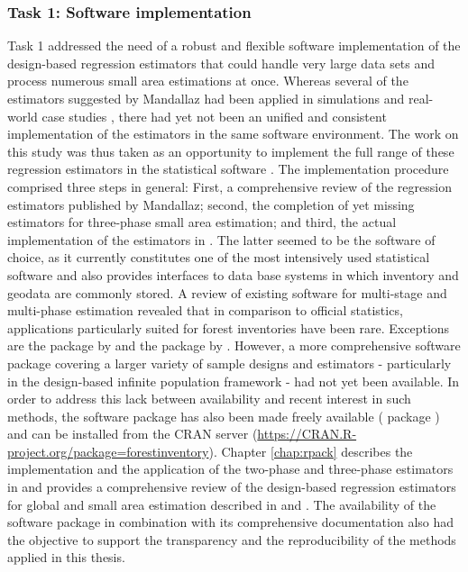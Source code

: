 \subsubsection{Task 1: Software implementation} %


Task 1 addressed the need of a robust and flexible software implementation of the design-based regression estimators that could handle very large data sets and process numerous small area estimations at once. Whereas several of the estimators suggested by Mandallaz had been applied in simulations and real-world case studies \citep{mandallaz2013a, mandallaz2013b, mandallaz2013c, massey2014a, massey2015a, massey2015b}, there had yet not been an unified and consistent implementation of the estimators in the same software environment. The work on this study was thus taken as an opportunity to implement the full range of these regression estimators in the statistical software  \citep{R}. The implementation procedure comprised three steps in general: First, a comprehensive review of the regression estimators published by Mandallaz; second, the completion of yet missing estimators for three-phase small area estimation; and third, the actual implementation of the estimators in . The latter seemed to be the software of choice, as it currently constitutes one of the most intensively used statistical software and also provides interfaces to data base systems in which inventory and geodata are commonly stored. A review of existing software for multi-stage and multi-phase estimation revealed that in comparison to official statistics, applications particularly suited for forest inventories have been rare. Exceptions are the  package  by \citet{josae2015} and the  package by \citet{cullmann2016}. However, a more comprehensive software package covering a larger variety of sample designs and estimators - particularly in the design-based infinite population framework - had not yet been available. In order to address this lack between availability and recent interest in such methods, the software package has also been made freely available ( package ) and can be installed from the CRAN server (\url{https://CRAN.R-project.org/package=forestinventory}). Chapter \ref{chap:rpack} describes the implementation and the application of the two-phase and three-phase estimators in  and provides a comprehensive review of the design-based regression estimators for global and small area estimation described in \citet{mandallaz2008, mandallaz2013a, mandallaz2013c} and \citet{mandallaz2013b}. The availability of the software package in combination with its comprehensive documentation also had the objective to support the transparency and the reproducibility of the methods applied in this thesis.


